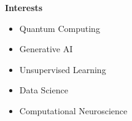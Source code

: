 \textcolor{accentcolor}{\textbf{\large {Interests}} }\\[0.2cm]

\begin{itemize}
    \item Quantum Computing
    \item Generative AI
    \item Unsupervised Learning
    \item Data Science
    \item Computational Neuroscience
\end{itemize}